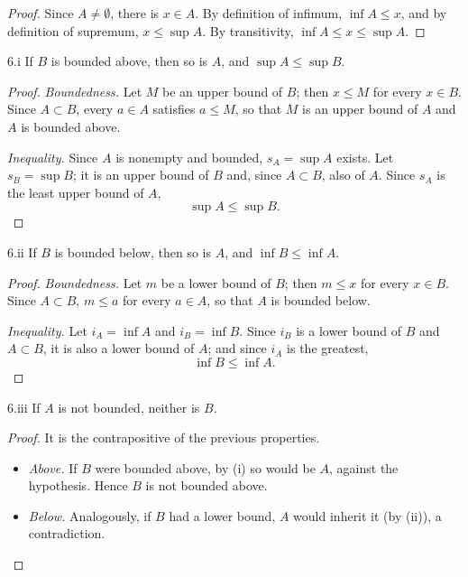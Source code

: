 \documentclass[11pt, a4paper]{article}
\begin{document}
\begin{proof}
Since $A \neq \emptyset$, there is $x \in A$. By definition of infimum, $\inf A \le x$, and by
definition of supremum, $x \le \sup A$. By transitivity, $\inf A \le x \le \sup A$.
\end{proof}

\begin{proposicion}{6.i}{}
If $B$ is bounded above, then so is $A$, and $\sup A \le \sup B$.
\end{proposicion}

\begin{proof}
\textit{Boundedness.} Let $M$ be an upper bound of $B$; then $x \le M$ for every $x \in B$. Since
$A \subset B$, every $a \in A$ satisfies $a \le M$, so that $M$ is an upper bound of $A$ and $A$ is
bounded above.

\textit{Inequality.} Since $A$ is nonempty and bounded, $s_A = \sup A$ exists. Let $s_B = \sup B$; it is
an upper bound of $B$ and, since $A \subset B$, also of $A$. Since $s_A$ is the least upper bound of
$A$,
$$ \sup A \le \sup B. $$
\end{proof}

\begin{proposicion}{6.ii}{}
If $B$ is bounded below, then so is $A$, and $\inf B \le \inf A$.
\end{proposicion}

\begin{proof}
\textit{Boundedness.} Let $m$ be a lower bound of $B$; then $m \le x$ for every $x \in B$. Since
$A \subset B$, $m \le a$ for every $a \in A$, so that $A$ is bounded below.

\textit{Inequality.} Let $i_A = \inf A$ and $i_B = \inf B$. Since $i_B$ is a lower bound of $B$ and
$A \subset B$, it is also a lower bound of $A$; and since $i_A$ is the greatest,
$$ \inf B \le \inf A. $$
\end{proof}

\begin{proposicion}{6.iii}{}
If $A$ is not bounded, neither is $B$.
\end{proposicion}

\begin{proof}
It is the contrapositive of the previous properties.
\begin{itemize}
    \item \textit{Above.} If $B$ were bounded above, by (i) so would be
    $A$, against the hypothesis. Hence $B$ is not bounded above.
    \item \textit{Below.} Analogously, if $B$ had a lower bound, $A$ would inherit it (by
    (ii)), a contradiction.
\end{itemize}
\end{proof}
\end{document}
